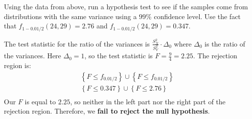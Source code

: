 
Using the data from above, run a hypothesis test to see if the samples come from
distributions with the same variance using a $99$\% confidence level. Use the fact
that $f_{1-0.01/2}(24, 29) = 2.76$ and $f_{1-0.01/2}(24, 29) = 0.347$. 



The test statistic for the ratio of the variances is $\frac{S_X^2}{S_Y^2} \cdot \Delta_0$
where $\Delta_0$ is the ratio of the variances. Here $\Delta_0 = 1$, so the test statistic
is $F = \frac{9}{4}=2.25$. The rejection region is:
\begin{align*}
\left\{F \leq f_{0.01/2} \right\} \cup \left\{F \leq f_{0.01/2} \right\} \\
\left\{F \leq 0.347 \right\} \cup \left\{F \leq 2.76 \right\} \\
\end{align*}
Our $F$ is equal to $2.25$, so neither in the left part nor the right part of the 
rejection region. Therefore, we \textbf{fail to reject the null hypothesis}.


